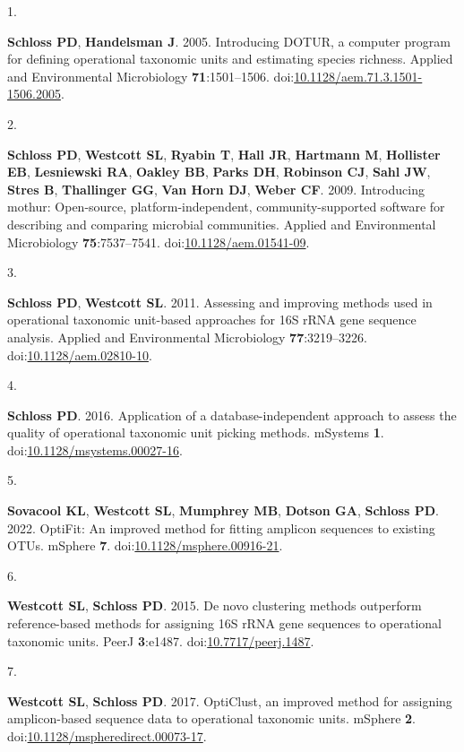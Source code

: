 \documentclass[
  11pt,
]{article}
\newlength{\cslhangindent}
\newlength{\csllabelwidth}
\newenvironment{CSLReferences}[2] %
 {\begin{list}{}{%
  \setlength{\itemindent}{0pt}
  \setlength{\leftmargin}{0pt}
  \setlength{\parsep}{0pt}
  \ifodd #1
   \setlength{\leftmargin}{\cslhangindent}
   \setlength{\itemindent}{-1\cslhangindent}
  \fi
  \setlength{\itemsep}{#2\baselineskip}}}
 {\end{list}}
\newcommand{\CSLLeftMargin}[1]{\parbox[t]{\csllabelwidth}{\strut#1\strut}}
\newcommand{\CSLRightInline}[1]{\parbox[t]{\linewidth - \csllabelwidth}{\strut#1\strut}}
\begin{document}
\label{refs}
\begin{CSLReferences}{0}{1}
\CSLLeftMargin{1. }%
\CSLRightInline{\textbf{Schloss PD}, \textbf{Handelsman J}. 2005.
Introducing DOTUR, a computer program for defining operational taxonomic
units and estimating species richness. Applied and Environmental
Microbiology \textbf{71}:1501--1506.
doi:\href{https://doi.org/10.1128/aem.71.3.1501-1506.2005}{10.1128/aem.71.3.1501-1506.2005}.}

\CSLLeftMargin{2. }%
\CSLRightInline{\textbf{Schloss PD}, \textbf{Westcott SL},
\textbf{Ryabin T}, \textbf{Hall JR}, \textbf{Hartmann M},
\textbf{Hollister EB}, \textbf{Lesniewski RA}, \textbf{Oakley BB},
\textbf{Parks DH}, \textbf{Robinson CJ}, \textbf{Sahl JW}, \textbf{Stres
B}, \textbf{Thallinger GG}, \textbf{Van Horn DJ}, \textbf{Weber CF}.
2009. Introducing mothur: Open-source, platform-independent,
community-supported software for describing and comparing microbial
communities. Applied and Environmental Microbiology
\textbf{75}:7537--7541.
doi:\href{https://doi.org/10.1128/aem.01541-09}{10.1128/aem.01541-09}.}

\CSLLeftMargin{3. }%
\CSLRightInline{\textbf{Schloss PD}, \textbf{Westcott SL}. 2011.
Assessing and improving methods used in operational taxonomic unit-based
approaches for 16S rRNA gene sequence analysis. Applied and
Environmental Microbiology \textbf{77}:3219--3226.
doi:\href{https://doi.org/10.1128/aem.02810-10}{10.1128/aem.02810-10}.}

\CSLLeftMargin{4. }%
\CSLRightInline{\textbf{Schloss PD}. 2016. Application of a
database-independent approach to assess the quality of operational
taxonomic unit picking methods. mSystems \textbf{1}.
doi:\href{https://doi.org/10.1128/msystems.00027-16}{10.1128/msystems.00027-16}.}

\CSLLeftMargin{5. }%
\CSLRightInline{\textbf{Sovacool KL}, \textbf{Westcott SL},
\textbf{Mumphrey MB}, \textbf{Dotson GA}, \textbf{Schloss PD}. 2022.
OptiFit: An improved method for fitting amplicon sequences to existing
OTUs. mSphere \textbf{7}.
doi:\href{https://doi.org/10.1128/msphere.00916-21}{10.1128/msphere.00916-21}.}

\CSLLeftMargin{6. }%
\CSLRightInline{\textbf{Westcott SL}, \textbf{Schloss PD}. 2015. De novo
clustering methods outperform reference-based methods for assigning 16S
rRNA gene sequences to operational taxonomic units. PeerJ
\textbf{3}:e1487.
doi:\href{https://doi.org/10.7717/peerj.1487}{10.7717/peerj.1487}.}

\CSLLeftMargin{7. }%
\CSLRightInline{\textbf{Westcott SL}, \textbf{Schloss PD}. 2017.
OptiClust, an improved method for assigning amplicon-based sequence data
to operational taxonomic units. mSphere \textbf{2}.
doi:\href{https://doi.org/10.1128/mspheredirect.00073-17}{10.1128/mspheredirect.00073-17}.}

\end{CSLReferences}
\end{document}
